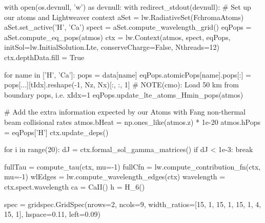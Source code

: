 \begin{pycode}[2DRT]
    with open(os.devnull, 'w') as devnull:
        with redirect_stdout(devnull):
            # Set up our atoms and Lightweaver context
            aSet = lw.RadiativeSet(FchromaAtoms)
            aSet.set_active('H', 'Ca')
            spect = aSet.compute_wavelength_grid()
            eqPops = aSet.compute_eq_pops(atmos)
            ctx = lw.Context(atmos, spect, eqPops, initSol=lw.InitialSolution.Lte, conserveCharge=False,
                            Nthreads=12)
            ctx.depthData.fill = True

            for name in ['H', 'Ca']:
                pops = data[name]
                eqPops.atomicPops[name].pops[:] = pops[...][tIdx].reshape(-1, Nz, Nx)[:, :, 1] # NOTE(cmo): Load 50 km from boundary pops, i.e. xIdx=1
            eqPops.update_lte_atoms_Hmin_pops(atmos)

            # Add the extra information expected by our Atoms with Fang non-thermal beam collisional rates
            atmos.bHeat = np.ones_like(atmos.z) * 1e-20
            atmos.hPops = eqPops['H']
            ctx.update_deps()

            for i in range(20):
                dJ = ctx.formal_sol_gamma_matrices()
                if dJ < 1e-3:
                    break

    fullTau = compute_tau(ctx, mu=-1)
    fullCfn = lw.compute_contribution_fn(ctx, mu=-1)
    wlEdges = lw.compute_wavelength_edges(ctx)
    wavelength = ctx.spect.wavelength
    ca = CaII()
    h = H_6()

    spec = gridspec.GridSpec(nrows=2, ncols=9, width_ratios=[15, 1, 15, 1, 15, 1, 4, 15, 1],
                             hspace=0.11, left=0.09)


\end{pycode}
